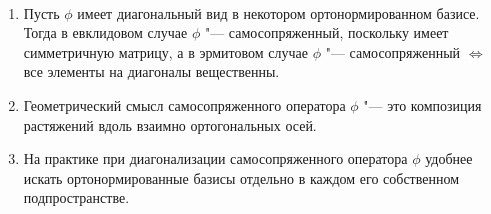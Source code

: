 \begin{note}~
	\begin{enumerate}
		\item Пусть $\phi$ имеет диагональный вид в некотором ортонормированном базисе. Тогда в евклидовом случае $\phi$ "--- самосопряженный, поскольку имеет симметричную матрицу, а в эрмитовом случае $\phi$ "--- самосопряженный $\Leftrightarrow$ все элементы на диагоналы вещественны.
		\item Геометрический смысл самосопряженного оператора $\phi$ "--- это композиция растяжений вдоль взаимно ортогональных осей.
		\item На практике при диагонализации самосопряженного оператора $\phi$ удобнее искать ортонормированные базисы отдельно в каждом его собственном подпространстве.
	\end{enumerate}
\end{note}